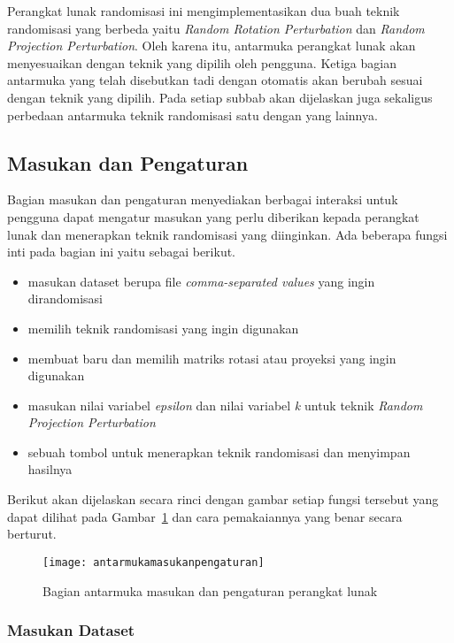 Perangkat lunak randomisasi ini mengimplementasikan dua buah teknik randomisasi yang berbeda yaitu \textit{Random Rotation Perturbation} dan \textit{Random Projection Perturbation}. Oleh karena itu, antarmuka perangkat lunak akan menyesuaikan dengan teknik yang dipilih oleh pengguna. Ketiga bagian antarmuka yang telah disebutkan tadi dengan otomatis akan berubah sesuai dengan teknik yang dipilih. Pada setiap subbab akan dijelaskan juga sekaligus perbedaan antarmuka teknik randomisasi satu dengan yang lainnya.

\subsection{Masukan dan Pengaturan}
\label{subsec:masukanpengaturan}

Bagian masukan dan pengaturan menyediakan berbagai interaksi untuk pengguna dapat mengatur masukan yang perlu diberikan kepada perangkat lunak dan menerapkan teknik randomisasi yang diinginkan. Ada beberapa fungsi inti pada bagian ini yaitu sebagai berikut.
\begin{itemize}
	\item masukan dataset berupa file \textit{comma-separated values} yang ingin dirandomisasi
	\item memilih teknik randomisasi yang ingin digunakan
	\item membuat baru dan memilih matriks rotasi atau proyeksi yang ingin digunakan
	\item masukan nilai variabel \textit{epsilon} dan nilai variabel \textit{k} untuk teknik \textit{Random Projection Perturbation}
	\item sebuah tombol untuk menerapkan teknik randomisasi dan menyimpan hasilnya
\end{itemize}
Berikut akan dijelaskan secara rinci dengan gambar setiap fungsi tersebut yang dapat dilihat pada Gambar~\ref{fig:antarmukamasukanpengaturan} dan cara pemakaiannya yang benar secara berturut. 

\begin{figure}
	\centering
	\texttt{[image: antarmukamasukanpengaturan]}
	\caption{Bagian antarmuka masukan dan pengaturan perangkat lunak}
	\label{fig:antarmukamasukanpengaturan}
\end{figure}

\subsubsection{Masukan Dataset}
\label{subsubsec:masukandataset}

